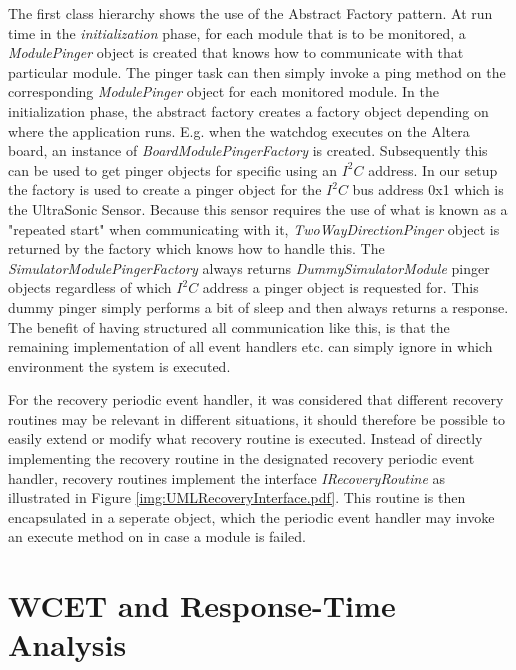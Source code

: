 The first class hierarchy shows the use of the Abstract Factory pattern. At run time in the \emph{initialization} phase, for each module that is to be monitored, a \emph{ModulePinger} object is created that knows how to communicate with that particular module. The pinger task can then simply invoke a ping method on the corresponding \emph{ModulePinger} object for each monitored module. In the initialization phase, the abstract factory creates a factory object depending on where the application runs. E.g. when the watchdog executes on the Altera board, an instance of \emph{BoardModulePingerFactory} is created. Subsequently this can be used to get pinger objects for specific using an $\textit{I}^2\textit{C}$ address. In our setup the factory is used to create a pinger object for the $\textit{I}^2\textit{C}$ bus address 0x1 which is the UltraSonic Sensor. Because this sensor requires the use of what is known as a "repeated start" when communicating with it, \emph{TwoWayDirectionPinger} object is returned by the factory which knows how to handle this.
The \emph{SimulatorModulePingerFactory} always returns \emph{DummySimulatorModule} pinger objects regardless of which $\textit{I}^2\textit{C}$ address a pinger object is requested for. This dummy pinger simply performs a bit of sleep and then always returns a response. The benefit of having structured all communication like this, is that the remaining implementation of all event handlers etc. can simply ignore in which environment the system is executed.

For the recovery periodic event handler, it was considered that different recovery routines may be relevant in different situations, it should therefore be possible to easily extend or modify what recovery routine is executed. Instead of directly implementing the recovery routine in the designated recovery periodic event handler, recovery routines implement the interface \emph{IRecoveryRoutine} as illustrated in Figure \ref{img:UMLRecoveryInterface.pdf}. This routine is then encapsulated in a seperate object, which the periodic event handler may invoke an execute method on in case a module is failed.

\chapter{WCET and Response-Time Analysis}
\label{chapter:wcetrta}
